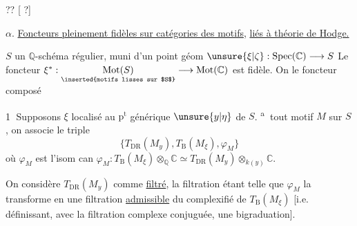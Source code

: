  ?? [ ?]


\textcircled{$\alpha$}. \uline{Foncteurs pleinement fidèles sur catégories des motifs}, \uline{liés à théorie de Hodge.}

$S$ un $\mathbb{Q}$-schéma régulier, muni d'un point géom $\unsure{\xi|\zeta}:\operatorname{Spec}(\mathbb{C})\longrightarrow S$
Le foncteur $\xi^*:\underset{\text{\inserted{motifs lisses sur $S$}}}{\operatorname{Mot}(S)}\longrightarrow\operatorname{Mot}(\mathbb{C})$ est fidèle. On  le foncteur composé

\textcircled{1}  Supposons $\xi$ localisé au $\mathrm{p}^{\mathrm t}$ générique $\unsure{y|\eta}$ de $S$.  \textsuperscript{\textcircled{a}}  tout motif $M$ sur $S$, on associe le triple
\[
\bigl\{T_{\mathrm{DR}}(M_y),T_{\mathrm B}(M_\xi),\varphi_M\bigr\}
\]
où $\varphi_M$ est l'isom can $\varphi_M:T_{\mathrm B}(M_\xi)\otimes_{\mathbb Q}\mathbb C\simeq T_{\mathrm{DR}}(M_y)\otimes_{k(y)}\mathbb C$.

On considère $T_{\mathrm{DR}}(M_y)$ comme \uline{filtré}, la filtration étant telle que $\varphi_M$ la transforme en une filtration \uline{admissible} du complexifié de $T_{\mathrm B}(M_\xi)$ [i.e. définissant, avec la filtration complexe conjuguée, une bigraduation].

